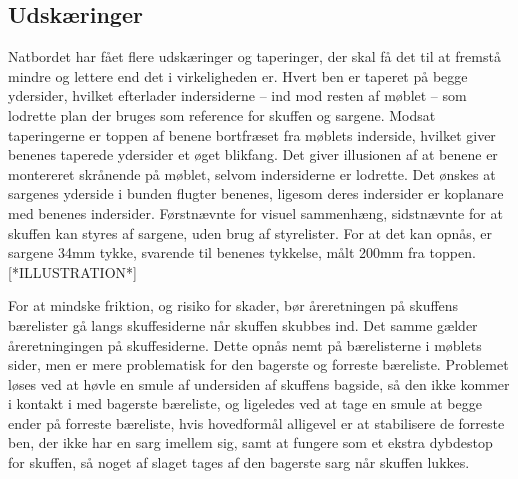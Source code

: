 
\subsection*{Udskæringer}
Natbordet har fået flere udskæringer og taperinger, der skal få det til at
fremstå mindre og lettere end det i virkeligheden er. Hvert ben er taperet på
begge ydersider, hvilket  efterlader indersiderne -- ind mod resten af møblet --
som lodrette plan der bruges som reference for skuffen og sargene. Modsat
taperingerne er toppen af benene bortfræset fra møblets inderside, hvilket giver
benenes taperede ydersider et øget blikfang. Det giver illusionen af at benene
er montereret skrånende på møblet, selvom indersiderne er lodrette. Det ønskes
at sargenes yderside i bunden flugter benenes, ligesom deres indersider er
koplanare med benenes indersider. Førstnævnte for visuel sammenhæng, sidstnævnte
for at skuffen kan styres af sargene, uden brug af styrelister. For at det kan
opnås, er sargene 34mm tykke, svarende til benenes tykkelse, målt 200mm fra
toppen. [*ILLUSTRATION*]

For at mindske friktion, og risiko for skader, bør åreretningen på skuffens
bærelister gå langs skuffesiderne når skuffen skubbes ind. Det samme gælder
åreretningingen på skuffesiderne. Dette opnås nemt på bærelisterne i møblets
sider, men er mere problematisk for den bagerste og forreste bæreliste.
Problemet løses ved at høvle en smule af undersiden af skuffens bagside, så den
ikke kommer i kontakt i med bagerste bæreliste, og ligeledes ved at tage en
smule at begge ender på forreste bæreliste, hvis hovedformål alligevel er at
stabilisere de forreste ben, der ikke har en sarg imellem sig, samt at fungere
som et ekstra dybdestop for skuffen, så noget af slaget tages af den
bagerste sarg når skuffen lukkes.

